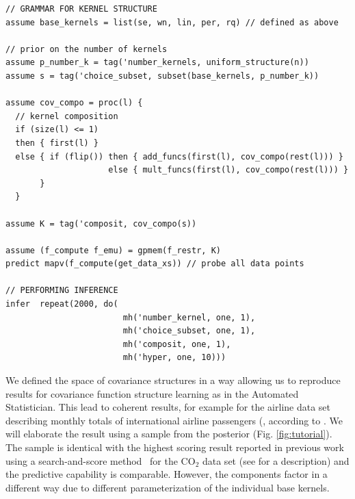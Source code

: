 \documentclass{article} %
\begin{document}
\begin{minipage}{\linewidth}
\small
\belowcaptionskip=-10pt
\begin{lstlisting}[frame=single,mathescape,label=alg:structureVent,basicstyle=\selectfont\ttfamily]
// GRAMMAR FOR KERNEL STRUCTURE
assume base_kernels = list(se, wn, lin, per, rq) // defined as above

// prior on the number of kernels
assume p_number_k = tag('number_kernels, uniform_structure(n))
assume s = tag('choice_subset, subset(base_kernels, p_number_k))

assume cov_compo = proc(l) {
  // kernel composition
  if (size(l) <= 1)
  then { first(l) }
  else { if (flip()) then { add_funcs(first(l), cov_compo(rest(l))) }
                     else { mult_funcs(first(l), cov_compo(rest(l))) }
       }
  }
                          
assume K = tag('composit, cov_compo(s))

assume (f_compute f_emu) = gpmem(f_restr, K)
predict mapv(f_compute(get_data_xs)) // probe all data points

// PERFORMING INFERENCE  
infer  repeat(2000, do(
                        mh('number_kernel, one, 1),
                        mh('choice_subset, one, 1),
                        mh('composit, one, 1),
                        mh('hyper, one, 10)))
\end{lstlisting}

\end{minipage}




We defined the space of covariance structures in a way allowing us to reproduce results for covariance function structure learning as in the Automated Statistician. This lead to coherent results, for example for the airline data set describing monthly totals of international airline passengers (\citealp{box2011time}, according to \citealp{duvenaud2013structure}. We will elaborate the result using a sample from the posterior (Fig. \ref{fig:tutorial}). The sample is identical with the highest scoring result reported in previous work using a search-and-score method~\citep{duvenaud2013structure} for the CO$_2$ data set (see \citealp{rasmussen2006gaussian} for a description) and the predictive capability is comparable. However, the components factor in a different way due to different parameterization of the individual base kernels.
\end{document}
